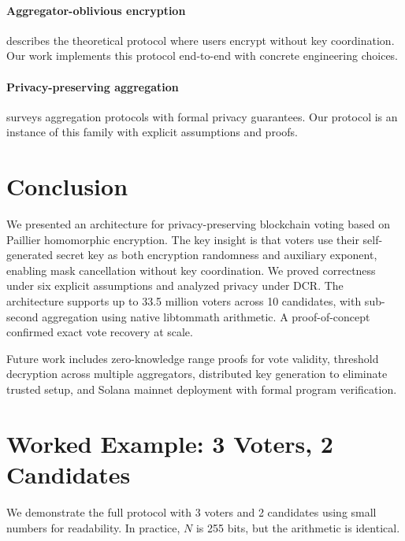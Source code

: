 \documentclass[11pt, a4paper]{article}
\begin{document}
\paragraph{Aggregator-oblivious encryption~\cite{lem14b}} describes the theoretical protocol where users encrypt without key coordination. Our work implements this protocol end-to-end with concrete engineering choices.

\paragraph{Privacy-preserving aggregation~\cite{popets2023}} surveys aggregation protocols with formal privacy guarantees. Our protocol is an instance of this family with explicit assumptions and proofs.

\section{Conclusion}\label{sec:conclusion}

We presented an architecture for privacy-preserving blockchain voting based on Paillier homomorphic encryption. The key insight is that voters use their self-generated secret key as both encryption randomness and auxiliary exponent, enabling mask cancellation without key coordination. We proved correctness under six explicit assumptions and analyzed privacy under DCR. The architecture supports up to 33.5 million voters across 10 candidates, with sub-second aggregation using native libtommath arithmetic. A proof-of-concept confirmed exact vote recovery at scale.

Future work includes zero-knowledge range proofs for vote validity, threshold decryption across multiple aggregators, distributed key generation to eliminate trusted setup, and Solana mainnet deployment with formal program verification.

\appendix
\section{Worked Example: 3 Voters, 2 Candidates}\label{sec:example}

We demonstrate the full protocol with 3 voters and 2 candidates using small numbers for readability. In practice, $N$ is 255 bits, but the arithmetic is identical.
\end{document}
